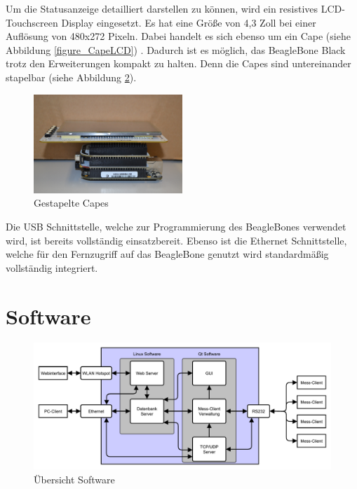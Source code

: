 Um die Statusanzeige detailliert darstellen zu können, wird ein resistives LCD-Touchscreen Display eingesetzt. Es hat eine Größe von 4,3 Zoll bei einer Auflösung von 480x272 Pixeln. Dabei handelt es sich ebenso um ein Cape (siehe Abbildung \ref{figure_CapeLCD}) . Dadurch ist es möglich, das BeagleBone Black trotz den Erweiterungen kompakt zu halten. Denn die Capes sind untereinander stapelbar (siehe Abbildung \ref{figure_GestapelteCapes}).\ 


\begin{figure}[H]
\begin{center}
\includegraphics[width=0.5\textwidth ]{img/general/GestapelteCapes.JPG}
\caption{Gestapelte Capes}
\label{figure_GestapelteCapes}
\end{center}
\end{figure}

Die USB Schnittstelle, welche zur Programmierung des BeagleBones verwendet wird, ist bereits vollständig einsatzbereit. Ebenso ist die Ethernet Schnittstelle, welche für den Fernzugriff auf das BeagleBone genutzt wird standardmäßig vollständig integriert.

\section{Software}
\label{ServerSoftware}

\begin{figure}[H]
\begin{center}
\includegraphics[width=\textwidth ]{img/general/UebersichtMasterSoftware.pdf}
\caption{Übersicht Software}
\label{figure_GestapelteCapes}
\end{center}
\end{figure}

